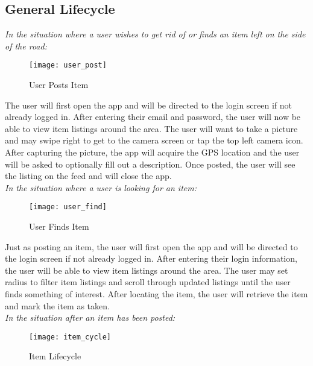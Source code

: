\documentclass[sigconf]{acmart}
\begin{document}
\subsection{General Lifecycle}

\emph{In the situation where a user wishes to get rid of or finds an item left on the side of the road:} \\ 

\begin{figure}[H]
	\texttt{[image: user\_post]}
	\caption{User Posts Item}
	\label{}
\end{figure}

\noindent
The user will first open the app and will be directed to the login screen if not already logged in. After entering their email and password, the user will now be able to view item listings around the area. The user will want to take a picture and may swipe right to get to the camera screen or tap the top left camera icon. After capturing the picture, the app will acquire the GPS location and the user will be asked to optionally fill out a description. Once posted, the user will see the listing on the feed and will close the app. \\

\noindent
\emph{In the situation where a user is looking for an item:} \\

\begin{figure}[H]
	\texttt{[image: user\_find]}
	\caption{User Finds Item}
	\label{}
\end{figure}

\noindent
Just as posting an item, the user will first open the app and will be directed to the login screen if not already logged in. After entering their login information, the user will be able to view item listings around the area. The user may set radius to filter item listings and scroll through updated listings until the user finds something of interest. After locating the item, the user will retrieve the item and mark the item as taken. \\


\noindent
\emph{In the situation after an item has been posted:}\\

\begin{figure}[H]
	\texttt{[image: item\_cycle]}
	\caption{Item Lifecycle}
	\label{}
\end{figure}
\end{document}
